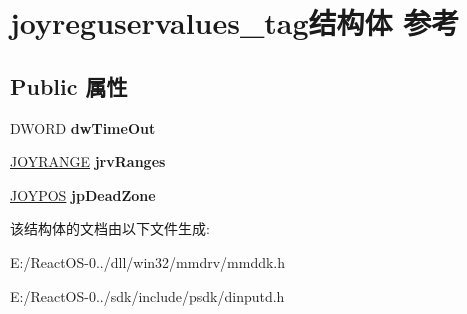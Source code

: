 \hypertarget{structjoyreguservalues__tag}{}\section{joyreguservalues\+\_\+tag结构体 参考}
\label{structjoyreguservalues__tag}
\subsection*{Public 属性}
\begin{DoxyCompactItemize}
\item 
\mbox{\label{structjoyreguservalues__tag_a549d4c237c9d83dc74eebf437beb8d39}} 
D\+W\+O\+RD {\bfseries dw\+Time\+Out}
\item 
\mbox{\label{structjoyreguservalues__tag_a9c117c0bb4941efd976680aacd74c74a}} 
\hyperlink{structjoyrange__tag}{J\+O\+Y\+R\+A\+N\+GE} {\bfseries jrv\+Ranges}
\item 
\mbox{\label{structjoyreguservalues__tag_ad7fc20cb45bc3cc98ee9b15ac6601c12}} 
\hyperlink{structjoypos__tag}{J\+O\+Y\+P\+OS} {\bfseries jp\+Dead\+Zone}
\end{DoxyCompactItemize}


该结构体的文档由以下文件生成\+:\begin{DoxyCompactItemize}
\item 
E\+:/\+React\+O\+S-\/0../dll/win32/mmdrv/mmddk.\+h\item 
E\+:/\+React\+O\+S-\/0../sdk/include/psdk/dinputd.\+h\end{DoxyCompactItemize}
